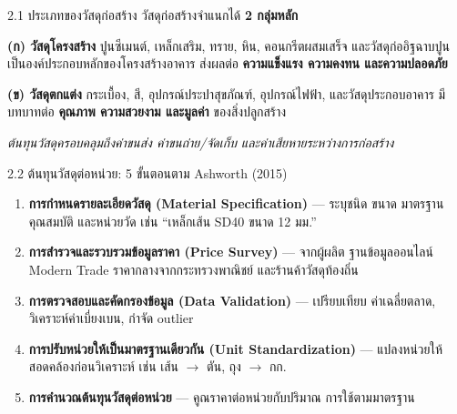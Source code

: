 \documentclass[aspectratio=169,11pt]{beamer}
\begin{document}
\begin{frame}{2.1 ประเภทของวัสดุก่อสร้าง}
  วัสดุก่อสร้างจำแนกได้ \textbf{2 กลุ่มหลัก}
  \vspace{0.3em}
  \begin{block}{\textbf{(ก) วัสดุโครงสร้าง}}
    ปูนซีเมนต์, เหล็กเสริม, ทราย, หิน, คอนกรีตผสมเสร็จ และวัสดุก่ออิฐฉาบปูน
    เป็นองค์ประกอบหลักของโครงสร้างอาคาร ส่งผลต่อ \textbf{ความแข็งแรง
    ความคงทน และความปลอดภัย}
  \end{block}
  \begin{block}{\textbf{(ข) วัสดุตกแต่ง}}
    กระเบื้อง, สี, อุปกรณ์ประปาสุขภัณฑ์, อุปกรณ์ไฟฟ้า, และวัสดุประกอบอาคาร
    มีบทบาทต่อ \textbf{คุณภาพ ความสวยงาม และมูลค่า} ของสิ่งปลูกสร้าง
  \end{block}
  \vspace{0.3em}
  \footnotesize\emph{ต้นทุนวัสดุครอบคลุมถึงค่าขนส่ง ค่าขนถ่าย/จัดเก็บ
  และค่าเสียหายระหว่างการก่อสร้าง}
\end{frame}

\begin{frame}{2.2 ต้นทุนวัสดุต่อหน่วย: 5 ขั้นตอนตาม Ashworth (2015)}
  \begin{enumerate}
    \item \textbf{การกำหนดรายละเอียดวัสดุ (Material Specification)} ---
          ระบุชนิด ขนาด มาตรฐาน คุณสมบัติ และหน่วยวัด เช่น ``เหล็กเส้น SD40
          ขนาด 12 มม.''
    \item \textbf{การสำรวจและรวบรวมข้อมูลราคา (Price Survey)} --- จากผู้ผลิต
          ฐานข้อมูลออนไลน์ Modern Trade ราคากลางจากกระทรวงพาณิชย์
          และร้านค้าวัสดุท้องถิ่น
    \item \textbf{การตรวจสอบและคัดกรองข้อมูล (Data Validation)} --- เปรียบเทียบ
          ค่าเฉลี่ยตลาด, วิเคราะห์ค่าเบี่ยงเบน, กำจัด outlier
    \item \textbf{การปรับหน่วยให้เป็นมาตรฐานเดียวกัน (Unit Standardization)} ---
          แปลงหน่วยให้สอดคล้องก่อนวิเคราะห์ เช่น เส้น $\to$ ตัน, ถุง $\to$ กก.
    \item \textbf{การคำนวณต้นทุนวัสดุต่อหน่วย} --- คูณราคาต่อหน่วยกับปริมาณ
          การใช้ตามมาตรฐาน
  \end{enumerate}
\end{frame}
\end{document}
